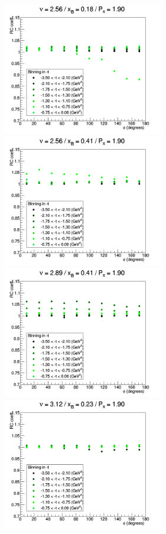 \begin{figure}[tbp]
\centering
\includegraphics[width=7cm] {chap5-fig/ElecRadWei_Iron_2356.png}
\includegraphics[width=7cm] {chap5-fig/ElecRadWei_Iron_3756.png}
\includegraphics[width=7cm] {chap5-fig/ElecRadWei_Iron_7756.png}
\includegraphics[width=7cm] {chap5-fig/ElecRadWei_Iron_10756.png}

\end{figure}

